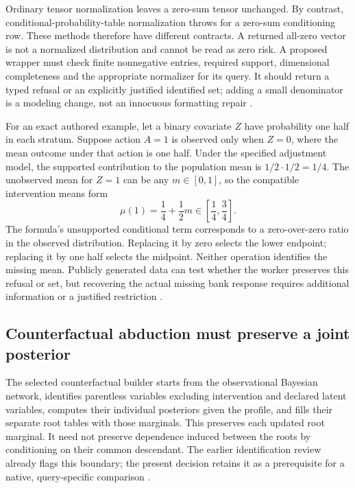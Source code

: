 Ordinary tensor normalization leaves a zero-sum tensor unchanged. By
contrast, conditional-probability-table normalization throws for a zero-sum
conditioning row. These methods therefore have different contracts.
A returned all-zero vector is not a normalized distribution and cannot be
read as zero risk. A proposed wrapper must check finite nonnegative entries,
required support, dimensional completeness and the appropriate normalizer
for its query. It should return a typed refusal or an explicitly justified
identified set; adding a small denominator is a modeling change, not an
innocuous formatting repair \citep{exec24_agrum_source,exec24_agrum_choice}.

For an exact authored example, let a binary covariate $Z$ have probability
one half in each stratum. Suppose action $A=1$ is observed only when $Z=0$,
where the mean outcome under that action is one half. Under the specified
adjustment model, the supported contribution to the population mean is
$1/2\cdot1/2=1/4$. The unobserved mean for $Z=1$ can be any $m\in[0,1]$,
so the compatible intervention means form
\[
 \mu(1)=\frac14+\frac12m\in\left[\frac14,\frac34\right].
\]
The formula's unsupported conditional term corresponds to a zero-over-zero
ratio in the observed distribution. Replacing it by zero selects the lower
endpoint; replacing it by one half selects the midpoint. Neither operation
identifies the missing mean. Publicly generated data can test whether the
worker preserves this refusal or set, but recovering the actual missing
bank response requires additional information or a justified restriction
\citep{exec24_agrum_choice}.

\subsection{Counterfactual abduction must preserve a joint posterior}
The selected counterfactual builder starts from the observational Bayesian
network, identifies parentless variables excluding intervention and declared
latent variables, computes their individual posteriors given the profile,
and fills their separate root tables with those marginals. This preserves
each updated root marginal. It need not preserve dependence induced between
the roots by conditioning on their common descendant. The earlier
identification review already flags this boundary; the present decision
retains it as a prerequisite for a native, query-specific comparison
\citep{exec19_cxx_identification_source,exec24_agrum_source}.

